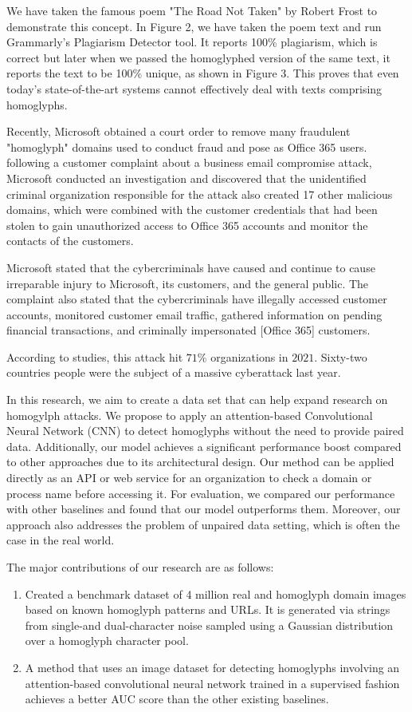 \documentclass[letterpaper]{article} \usepackage{aaai22}  \usepackage{times}  \usepackage{helvet}  \usepackage{courier}  \usepackage[hyphens]{url}  \usepackage{graphicx} \urlstyle{rm} \def\UrlFont{\rm}  \usepackage{natbib}  \usepackage{caption} \DeclareCaptionStyle{ruled}{labelfont=normalfont,labelsep=colon,strut=off} \frenchspacing  \setlength{\pdfpagewidth}{8.5in}  \setlength{\pdfpageheight}{11in}  \usepackage{algorithm}
\begin{document}
We have taken the famous poem "The Road Not Taken" by Robert Frost to demonstrate this concept. In Figure 2, we have taken the poem text and run Grammarly's Plagiarism Detector tool. It reports 100\% plagiarism, which is correct but later when we passed the homoglyphed version of the same text, it reports the text to be 100\% unique, as shown in Figure 3. This proves that even today's state-of-the-art systems cannot effectively deal with texts comprising homoglyphs.

Recently, Microsoft obtained a court order to remove many fraudulent "homoglyph" domains used to conduct fraud and pose as Office 365 users.\cite{Microsof97:online} following a customer complaint about a business email compromise attack, Microsoft conducted an investigation and discovered that the unidentified criminal organization responsible for the attack also created 17 other malicious domains, which were combined with the customer credentials that had been stolen to gain unauthorized access to Office 365 accounts and monitor the contacts of the customers.

Microsoft stated that the cybercriminals have caused and continue to cause irreparable injury to Microsoft, its customers, and the general public. The complaint also stated that the cybercriminals have illegally accessed customer accounts, monitored customer email traffic, gathered information on pending financial transactions, and criminally impersonated [Office 365] customers.

According to studies, this attack hit $71\%$ organizations in $2021$. Sixty-two countries people were the subject of a massive cyberattack last year.

In this research, we aim to create a data set that can help expand research on homogylph attacks. We propose to apply an attention-based Convolutional Neural Network (CNN) to detect homoglyphs without the need to provide paired data. Additionally, our model achieves a significant performance boost compared to other approaches due to its architectural design. Our method can be applied directly as an API or web service for an organization to check a domain or process name before accessing it. For evaluation, we compared our performance with other baselines and found that our model outperforms them. Moreover, our approach also addresses the problem of unpaired data setting, which is often the case in the real world. 

The major contributions of our research are as follows:
\begin{enumerate}

\item Created a benchmark dataset of 4 million real and homoglyph domain images based on known homoglyph patterns and URLs. It is generated via strings from single-and dual-character noise sampled using a Gaussian distribution over a homoglyph character pool. 


\item A method that uses an image dataset for detecting homoglyphs involving an attention-based convolutional neural network trained in a supervised fashion achieves a better AUC score than the other existing baselines.
\end{enumerate} 
\end{document}
